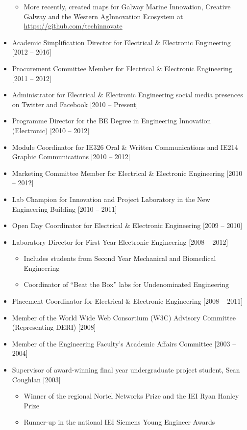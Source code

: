 \documentclass[10pt,a4paper]{res} %
\begin{document}
\begin{resume}
\begin{itemize}
\begin{itemize}
\item More recently, created maps for Galway Marine Innovation, Creative Galway and the Western AgInnovation Ecosystem at \url{https://github.com/techinnovate}
\end{itemize}
\item Academic Simplification Director for Electrical \& Electronic Engineering [2012 -- 2016]
\item Procurement Committee Member for Electrical \& Electronic Engineering [2011 -- 2012]
\item Administrator for Electrical \& Electronic Engineering social media presences on Twitter and Facebook [2010 -- Present]
\item Programme Director for the BE Degree in Engineering Innovation (Electronic) [2010 -- 2012]
\item Module Coordinator for IE326 Oral \& Written Communications and IE214 Graphic Communications [2010 -- 2012]
\item Marketing Committee Member for Electrical \& Electronic Engineering [2010 -- 2012]
\item Lab Champion for Innovation and Project Laboratory in the New Engineering Building [2010 -- 2011]
\item Open Day Coordinator for Electrical \& Electronic Engineering [2009 -- 2010]
\item Laboratory Director for First Year Electronic Engineering [2008 -- 2012]
\begin{itemize} \itemsep -2pt
\item Includes students from Second Year Mechanical and Biomedical Engineering
\item Coordinator of ``Beat the Box'' labs for Undenominated Engineering
\end{itemize}
\item Placement Coordinator for Electrical \& Electronic Engineering [2008 -- 2011]
\item Member of the World Wide Web Consortium (W3C) Advisory Committee (Representing DERI) [2008]
\item Member of the Engineering Faculty's Academic Affairs Committee [2003 -- 2004]
\item Supervisor of award-winning final year undergraduate project student, Sean Coughlan [2003]
\begin{itemize} \itemsep -2pt
\item Winner of the regional Nortel Networks Prize and the IEI Ryan Hanley Prize
\item Runner-up in the national IEI Siemens Young Engineer Awards

\end{itemize}
\end{itemize}
\end{resume}
\end{document}
